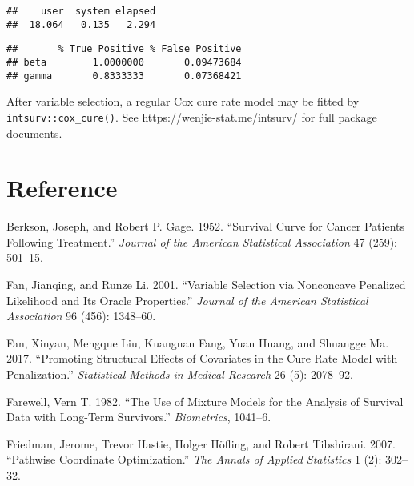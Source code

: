 \begin{verbatim}
##    user  system elapsed 
##  18.064   0.135   2.294
\end{verbatim}

\begin{Shaded}
\begin{Highlighting}[]
\end{Highlighting}
\end{Shaded}

\begin{verbatim}
##       % True Positive % False Positive
## beta        1.0000000       0.09473684
## gamma       0.8333333       0.07368421
\end{verbatim}

After variable selection, a regular Cox cure rate model may be fitted by
\texttt{intsurv::cox\_cure()}. See \url{https://wenjie-stat.me/intsurv/}
for full package documents.

\section*{Reference}
\setlength{\parindent}{0em}
\setlength{\parskip}{0.15em}

\hypertarget{refs}{}
\leavevmode\hypertarget{ref-berkson1952jasa}{}%
Berkson, Joseph, and Robert P. Gage. 1952. ``Survival Curve for Cancer
Patients Following Treatment.'' \emph{Journal of the American
Statistical Association} 47 (259): 501--15.

\leavevmode\hypertarget{ref-fanLi2001jasa}{}%
Fan, Jianqing, and Runze Li. 2001. ``Variable Selection via Nonconcave
Penalized Likelihood and Its Oracle Properties.'' \emph{Journal of the
American Statistical Association} 96 (456): 1348--60.

\leavevmode\hypertarget{ref-fan2017smmr}{}%
Fan, Xinyan, Mengque Liu, Kuangnan Fang, Yuan Huang, and Shuangge Ma.
2017. ``Promoting Structural Effects of Covariates in the Cure Rate
Model with Penalization.'' \emph{Statistical Methods in Medical
Research} 26 (5): 2078--92.

\leavevmode\hypertarget{ref-farewell1982biometrics}{}%
Farewell, Vern T. 1982. ``The Use of Mixture Models for the Analysis of
Survival Data with Long-Term Survivors.'' \emph{Biometrics}, 1041--6.

\leavevmode\hypertarget{ref-friedman2007aoas}{}%
Friedman, Jerome, Trevor Hastie, Holger Höfling, and Robert Tibshirani.
2007. ``Pathwise Coordinate Optimization.'' \emph{The Annals of Applied
Statistics} 1 (2): 302--32.

